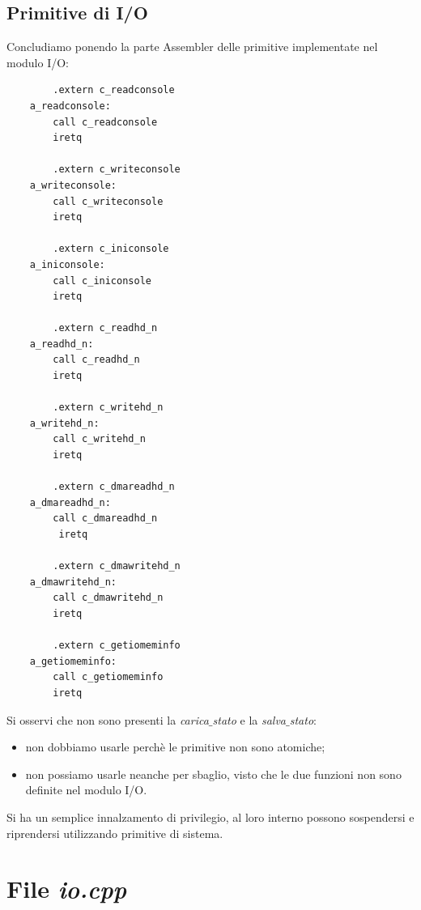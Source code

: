 \documentclass[11pt]{report}
\theoremstyle{definition}
\begin{document}
\subsection{Primitive di I/O}
Concludiamo ponendo la parte Assembler delle primitive implementate nel modulo I/O:
\begin{multicols}{2}
\small
\begin{verbatim}
    	.extern c_readconsole
	a_readconsole:
    	call c_readconsole
    	iretq
	
    	.extern c_writeconsole
	a_writeconsole:
    	call c_writeconsole
    	iretq
	
    	.extern c_iniconsole
	a_iniconsole:
    	call c_iniconsole
    	iretq
	
    	.extern	c_readhd_n
	a_readhd_n:
    	call c_readhd_n
    	iretq
	
    	.extern	c_writehd_n
	a_writehd_n:
    	call c_writehd_n
    	iretq
	
    	.extern	c_dmareadhd_n
	a_dmareadhd_n:
    	call c_dmareadhd_n
	     iretq
	
	    .extern	c_dmawritehd_n
	a_dmawritehd_n:
	    call c_dmawritehd_n
	    iretq
	
	    .extern	c_getiomeminfo
	a_getiomeminfo:
	    call c_getiomeminfo
	    iretq
\end{verbatim}
\normalsize 
\end{multicols}
\noindent Si osservi che non sono presenti la \emph{carica$\_$stato} e la \emph{salva$\_$stato}: 
\begin{itemize}
	\item non dobbiamo usarle perchè le primitive non sono atomiche;
	\item non possiamo usarle neanche per sbaglio, visto che le due funzioni non sono definite nel modulo I/O.
\end{itemize}
Si ha un semplice innalzamento di privilegio, al loro interno possono sospendersi e riprendersi utilizzando primitive di sistema.

\section{File \emph{io.cpp}}
\end{document}
